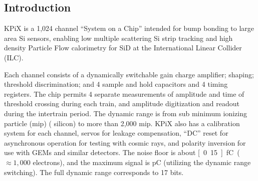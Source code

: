 
\subsection{Introduction}
KPiX is a 1,024 channel “System on a Chip” intended for bump bonding to large area Si sensors, enabling low multiple scattering Si strip tracking and high density Particle Flow calorimetry for SiD at the International Linear Collider (ILC).

Each channel consists of a dynamically switchable gain charge amplifier; shaping; threshold discrimination; and 4 sample and hold capacitors and 4 timing registers. The chip permits 4 separate measurements of amplitude and time of threshold crossing during each train, and amplitude digitization and readout during the intertrain period. The dynamic range is from sub minimum ionizing particle (mip) (\unit[320]{\micron} silicon) to more than 2,000 mip. KPiX also has a calibration system for each channel, servos for leakage compensation, “DC” reset for asynchronous operation for testing with cosmic rays, and polarity inversion for use with GEMs and similar detectors. The noise floor is about \unit[0.15]{fC} ($\approx 1,000$ electrons), and the maximum signal is \unit[10]{pC} (utilizing the dynamic range switching). The full dynamic range corresponds to 17 bits.

